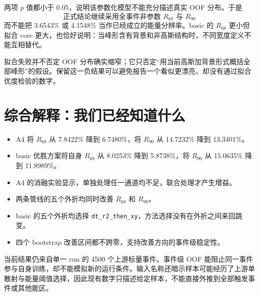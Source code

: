 \documentclass[UTF8,11pt,a4paper,oneside,fontset=none]{ctexart}
\newcommand{\Rsixtyeight}{R_{68}}
\newcommand{\Rninty}{R_{90}}
\begin{document}
两项 $p$ 值都小于 0.05，说明该参数化模型不能充分描述真实 OOF 分布。于是
\[
\boxed{\text{正式结论继续采用全事件非参数 }\Rsixtyeight\text{ 与 }\Rninty}
\]
而不能把 3.6543\% 或 4.1548\% 当作已经成立的能量分辨率。basic 的 \(\Rsixtyeight\) 更小但拟合 core 更大，也恰好说明：当峰形含有背景和非高斯结构时，不同宽度定义不能互相替代。

\begin{infobox}[title={这项“拒绝”是有价值的结果},fonttitle=\bfseries]
拟合失败并不否定 OOF 分布确实缩窄；它只否定“用当前高斯加背景形式概括全部峰形”的假设。保留这一负结果可以避免报告一个看似更漂亮、却没有通过拟合优度检验的数字。
\end{infobox}
\clearpage

\section{综合解释：我们已经知道什么}

\begin{resultbox}[title={证据层级一：直接观察成立},fonttitle=\bfseries]
\begin{itemize}
  \item A4 将 \(\Rsixtyeight\) 从 7.8422\% 降到 6.7480\%，将 \(\Rninty\) 从 14.7232\% 降到 13.3401\%。
  \item basic 优胜方案将自身 \(\Rsixtyeight\) 从 8.0253\% 降到 5.8738\%，将 \(\Rninty\) 从 15.0635\% 降到 11.8989\%。
  \item A4 的消融实验显示，单独处理任一通道均不足，联合处理才产生增益。
\end{itemize}
\end{resultbox}

\begin{infobox}[title={证据层级二：同一 run 内稳定},fonttitle=\bfseries]
\begin{itemize}
  \item 两条管线的五个外折均同时改善 \(\Rsixtyeight\) 和 \(\Rninty\)。
  \item basic 的五个外折均选择 \texttt{dt\_r2\_then\_xy}，方法选择没有在外折之间来回跳变。
  \item 四个 bootstrap 改善区间都不跨零，支持改善方向的事件级稳定性。
\end{itemize}
\end{infobox}

\begin{boundarybox}[title={证据层级三：尚未证明跨 run 泛化},fonttitle=\bfseries]
当前结果仍来自单一 run 的 4500 个上游标量事件。事件级 OOF 能阻止同一事件参与自身训练，却不能模拟新的运行条件。输入名称还暗示样本可能经历了上游单散射与能量阈值选择，因此现有数字只描述给定样本，不能直接外推到全部触发事件或其他能区。
\end{boundarybox}
\end{document}
